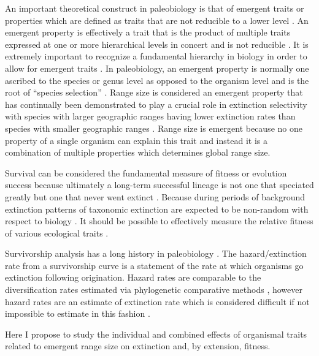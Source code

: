 \documentclass[12pt,letterpaper]{article}
\begin{document}
An important theoretical construct in paleobiology is that of emergent traits or properties which are defined as traits that are not reducible to a lower level \citep{Grantham1995,Vrba1984,Jablonski2008a,Lloyd1993}. An emergent property is effectively a trait that is the product of multiple traits expressed at one or more hierarchical levels in concert and is not reducible \citep{Vrba1984,Jablonski2008a}. It is extremely important to recognize a fundamental hierarchy in biology in order to allow for emergent traits \citep{Vrba1984}. In paleobiology, an emergent property is normally one ascribed to the species or genus level as opposed to the organism level and is the root of ``species selection'' \citep{Jablonski2008a,Vrba1984,Lloyd1993,Grantham1995}. Range size is considered an emergent property that has continually been demonstrated to play a crucial role in extinction selectivity with species with larger geographic ranges having lower extinction rates than species with smaller geographic ranges \citep{Jablonski1986,Harnik2013,Nurnberg2013a,Jablonski2003,Roy2009c}. Range size is emergent because no one property of a single organism can explain this trait and instead it is a combination of multiple properties which determines global range size.

Survival can be considered the fundamental measure of fitness or evolution success \citep{Cooper1984,Palmer2012} because ultimately a long-term successful lineage is not one that speciated greatly but one that never went extinct \citep{Palmer2012}. Because during periods of background extinction patterns of taxonomic extinction are expected to be non-random with respect to biology \citep{Jablonski1986}. It should be possible to effectively measure the relative fitness of various ecological traits \citep{Kitchell1990,Kitchell1985a}. 

Survivorship analysis has a long history in paleobiology \citep{Simpson1944,VanValen1979,Foote1988,Baumiller1993,Kitchell1987b,Kitchell1990,Simpson1953,Raup1991a,Simpson2006}. The hazard/extinction rate from a survivorship curve is a statement of the rate at which organisms go extinction following origination. Hazard rates are comparable to the diversification rates estimated via phylogenetic comparative methods \citep{Fitzjohn2010,Maddison2007,Rabosky2013,Nee2001,Nee1994d,Nee1992}, however hazard rates are an estimate of extinction rate which is considered difficult if not impossible to estimate in this fashion \citep{Rabosky2010a}.

Here I propose to study the individual and combined effects of organismal traits related to emergent range size on extinction and, by extension, fitness.
\end{document}
